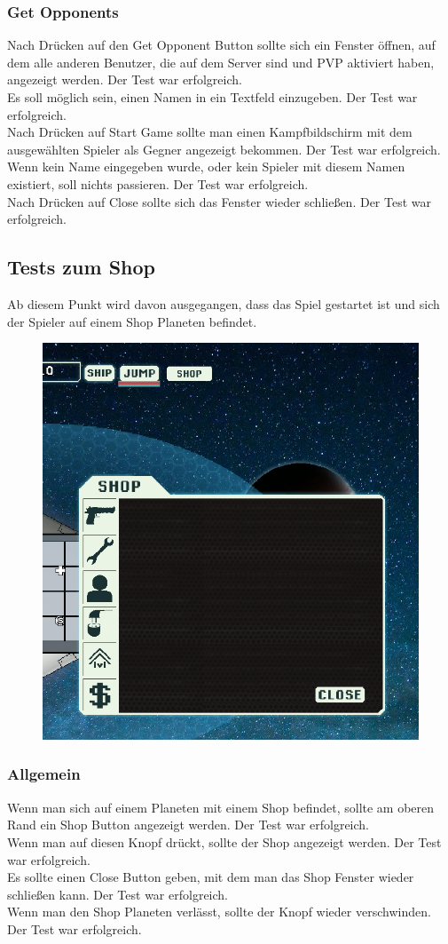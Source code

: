 \documentclass[fontsize=12pt,paper=a4,twoside]{scrartcl}
\begin{document}
\subsubsection{Get Opponents}
Nach Drücken auf den Get Opponent Button sollte sich ein Fenster öffnen, auf dem alle anderen Benutzer, die auf dem Server sind und PVP aktiviert haben, angezeigt werden.  Der Test war erfolgreich. \\
Es soll möglich sein, einen Namen in ein Textfeld einzugeben.  Der Test war erfolgreich. \\
Nach Drücken auf Start Game sollte man einen Kampfbildschirm mit dem ausgewählten Spieler als Gegner angezeigt bekommen.  Der Test war erfolgreich. \\
Wenn kein Name eingegeben wurde, oder kein Spieler mit diesem Namen existiert, soll nichts passieren.  Der Test war erfolgreich. \\
Nach Drücken auf Close sollte sich das Fenster wieder schließen.  Der Test war erfolgreich. \\

\subsection{Tests zum Shop}
Ab diesem Punkt wird davon ausgegangen, dass das Spiel gestartet ist und sich der Spieler auf einem Shop Planeten befindet. \\
\begin{figure}[h!]
\centering
\includegraphics[width=0.5\linewidth]{images/shop.png}
\end{figure}
\subsubsection{Allgemein}
Wenn man sich auf einem Planeten mit einem Shop befindet, sollte am oberen Rand ein Shop Button angezeigt werden.  Der Test war erfolgreich. \\
Wenn man auf diesen Knopf drückt, sollte der Shop angezeigt werden.  Der Test war erfolgreich. \\
Es sollte einen Close Button geben, mit dem man das Shop Fenster wieder schließen kann.  Der Test war erfolgreich. \\
Wenn man den Shop Planeten verlässt, sollte der Knopf wieder verschwinden.  Der Test war erfolgreich. \\
\end{document}
